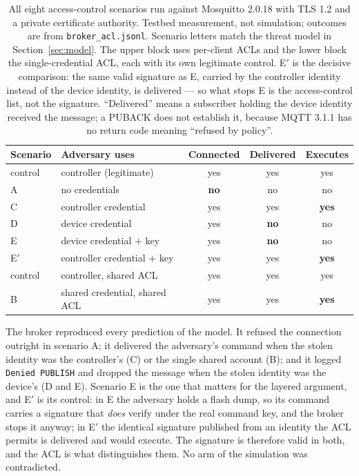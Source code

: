 \begin{table}[htbp]
\centering\small
\caption{All eight access-control scenarios run against Mosquitto 2.0.18 with TLS 1.2 and a
private certificate authority. Testbed measurement, not simulation; outcomes are from
\texttt{broker\_acl.jsonl}. Scenario letters match the threat model in
Section~\ref{sec:model}. The upper block uses per-client ACLs and the lower block the
single-credential ACL, each with its own legitimate control. E$'$ is the decisive comparison:
the same valid signature as E, carried by the controller identity instead of the device
identity, is delivered --- so what stops E is the access-control list, not the signature.
``Delivered'' means a subscriber holding the device identity received the message; a PUBACK
does not establish it, because MQTT 3.1.1 has no return code meaning ``refused by policy''.}
\label{tab:broker}
\begin{tabular}{@{}llccc@{}}
\toprule
Scenario & Adversary uses & Connected & Delivered & Executes \\
\midrule
control & controller (legitimate) & yes & yes & yes \\
A & no credentials          & \textbf{no} & no  & no \\
C & controller credential   & yes & yes & \textbf{yes} \\
D & device credential       & yes & \textbf{no}  & no \\
E & device credential + key & yes & \textbf{no}  & no \\
E$'$ & controller credential + key & yes & yes & \textbf{yes} \\
\midrule
control & controller, shared ACL & yes & yes & yes \\
B & shared credential, shared ACL & yes & yes & \textbf{yes} \\
\bottomrule
\end{tabular}
\end{table}

The broker reproduced every prediction of the model. It refused the connection outright in
scenario A; it delivered the adversary's command when the stolen identity was the controller's
(C) or the single shared account (B); and it logged \texttt{Denied PUBLISH} and dropped the
message when the stolen identity was the device's (D and E). Scenario E is the one that matters
for the layered argument, and E$'$ is its control: in E the adversary holds a flash dump, so its
command carries a signature that \emph{does} verify under the real command key, and the broker
stops it anyway; in E$'$ the identical signature published from an identity the ACL permits is
delivered and would execute. The signature is therefore valid in both, and the ACL is what
distinguishes them. No arm of the simulation was contradicted.


